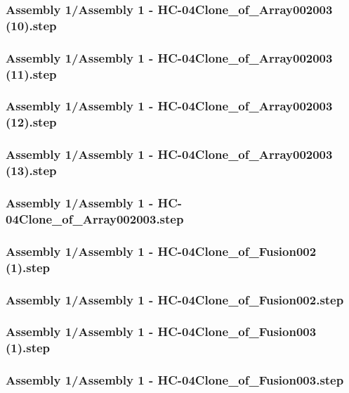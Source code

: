 \documentclass[a4paper,12pt]{article}
\begin{document}
\begin{lstlising}[language=C++]
\subsubsection{Assembly 1/Assembly 1 - HC-04Clone_of_Array002003 (10).step}

\subsubsection{Assembly 1/Assembly 1 - HC-04Clone_of_Array002003 (11).step}

\subsubsection{Assembly 1/Assembly 1 - HC-04Clone_of_Array002003 (12).step}

\subsubsection{Assembly 1/Assembly 1 - HC-04Clone_of_Array002003 (13).step}

\subsubsection{Assembly 1/Assembly 1 - HC-04Clone_of_Array002003.step}

\subsubsection{Assembly 1/Assembly 1 - HC-04Clone_of_Fusion002 (1).step}

\subsubsection{Assembly 1/Assembly 1 - HC-04Clone_of_Fusion002.step}

\subsubsection{Assembly 1/Assembly 1 - HC-04Clone_of_Fusion003 (1).step}

\subsubsection{Assembly 1/Assembly 1 - HC-04Clone_of_Fusion003.step}


\end{lstlising}
\end{document}
